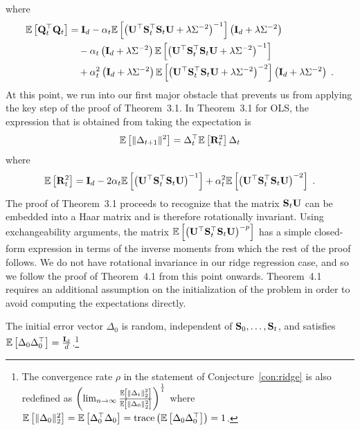 where
\begin{align*}
\mathbb{E}\left[\mathbf{Q}_t^\top\mathbf{Q}_t\right] &= \mathbf{I}_d - \alpha_t\mathbb{E}\left[\left(\mathbf{U}^\top\mathbf{S}_t^\top\mathbf{S}_t\mathbf{U} + \lambda\Sigma^{-2}\right)^{-1}\right]\left(\mathbf{I}_d + \lambda\Sigma^{-2}\right) \\
&\quad - \alpha_t\left(\mathbf{I}_d + \lambda\Sigma^{-2}\right)\mathbb{E}\left[\left(\mathbf{U}^\top\mathbf{S}_t^\top\mathbf{S}_t\mathbf{U} + \lambda\Sigma^{-2}\right)^{-1}\right] \\
&\quad + \alpha_t^2\left(\mathbf{I}_d + \lambda\Sigma^{-2}\right)\mathbb{E}\left[\left(\mathbf{U}^\top\mathbf{S}_t^\top\mathbf{S}_t\mathbf{U} + \lambda\Sigma^{-2}\right)^{-2}\right]\left(\mathbf{I}_d + \lambda\Sigma^{-2}\right) \;.
\end{align*}
At this point, we run into our first major obstacle that prevents us from applying the key step of the proof of Theorem~3.1. In Theorem~3.1 for OLS, the expression that is obtained from taking the expectation is
\[
\mathbb{E}\left[\|\Delta_{t+1}\|^2\right] = \Delta_t^\top\mathbb{E}\left[\mathbf{R}_t^2\right]\Delta_t
\]
where
\[
\mathbb{E}\left[\mathbf{R}_t^2\right] = \mathbf{I}_d - 2\alpha_t\mathbb{E}\left[\left(\mathbf{U}^\top\mathbf{S}_t^\top\mathbf{S}_t\mathbf{U}\right)^{-1}\right] + \alpha_t^2\mathbb{E}\left[\left(\mathbf{U}^\top\mathbf{S}_t^\top\mathbf{S}_t\mathbf{U}\right)^{-2}\right] \;.
\]
The proof of Theorem~3.1 proceeds to recognize that the matrix $\mathbf{S}_t\mathbf{U}$ can be embedded into a Haar matrix and is therefore rotationally invariant. Using exchangeability arguments, the matrix $\mathbb{E}\left[\left(\mathbf{U}^\top\mathbf{S}_t^\top\mathbf{S}_t\mathbf{U}\right)^{-p}\right]$ has a simple closed-form expression in terms of the inverse moments from which the rest of the proof follows. We do not have rotational invariance in our ridge regression case, and so we follow the proof of Theorem~4.1 from this point onwards. Theorem~4.1 requires an additional assumption on the initialization of the problem in order to avoid computing the expectations directly.

\begin{assumption} \label{asp:initialization}
The initial error vector $\Delta_0$ is random, independent of $\mathbf{S}_0,\ldots,\mathbf{S}_t$, and satisfies $\mathbb{E}\left[\Delta_0\Delta_0^\top\right]=\frac{\mathbf{I}_d}{d}$.\footnote{The convergence rate $\rho$ in the statement of Conjecture~\ref{con:ridge} is also redefined as $\left(\lim_{n\rightarrow\infty}\frac{\mathbb{E}\left[\|\Delta_t\|_2^2\right]}{\mathbb{E}\left[\|\Delta_0\|_2^2\right]}\right)^\frac{1}{t}$ where $\mathbb{E}\left[\|\Delta_0\|_2^2\right]=\mathbb{E}\left[\Delta_0^\top\Delta_0\right]=\mathrm{trace}\left(\mathbb{E}\left[\Delta_0\Delta_0^\top\right]\right)=1$.}
\end{assumption}

